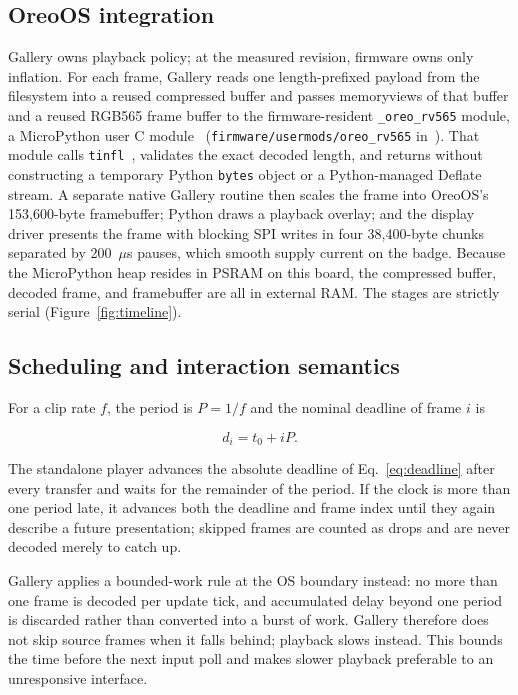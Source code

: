 \documentclass[11pt,twocolumn]{article}
\begin{document}
\subsection{OreoOS integration}

Gallery owns playback policy; at the measured revision, firmware owns only
inflation.  For each frame, Gallery reads one length-prefixed payload from the
filesystem into a reused compressed buffer and passes memoryviews of that
buffer and a reused RGB565 frame buffer to the firmware-resident
\texttt{\_oreo\_rv565} module, a MicroPython user C
module~\cite{micropython} (\texttt{firmware/usermods/oreo\_rv565}
in~\cite{bhattacharya2026oreo}).  That module calls
\texttt{tinfl}~\cite{miniz}, validates the exact decoded length, and returns
without constructing a temporary Python \texttt{bytes} object or a
Python-managed Deflate stream.  A separate native Gallery routine then scales
the frame into OreoOS's 153,600-byte framebuffer; Python draws a playback
overlay; and the display driver presents the frame with blocking SPI writes in
four 38,400-byte chunks separated by 200~$\mu$s pauses, which smooth supply
current on the badge.  Because the MicroPython heap resides in PSRAM on this
board, the compressed buffer, decoded frame, and framebuffer are all in
external RAM.  The stages are strictly serial (Figure~\ref{fig:timeline}).

\subsection{Scheduling and interaction semantics}

For a clip rate $f$, the period is $P=1/f$ and the nominal deadline of frame
$i$ is

\begin{equation}
d_i=t_0+iP.
\label{eq:deadline}
\end{equation}

The standalone player advances the absolute deadline of
Eq.~\eqref{eq:deadline} after every transfer and waits for the remainder of
the period.  If the clock is more than one period late, it advances both the
deadline and frame index until they again describe a future presentation;
skipped frames are counted as drops and are never decoded merely to catch up.

Gallery applies a bounded-work rule at the OS boundary instead: no more than
one frame is decoded per update tick, and accumulated delay beyond one period
is discarded rather than converted into a burst of work.  Gallery therefore
does not skip source frames when it falls behind; playback slows instead.
This bounds the time before the next input poll and makes slower playback
preferable to an unresponsive interface.
\end{document}
